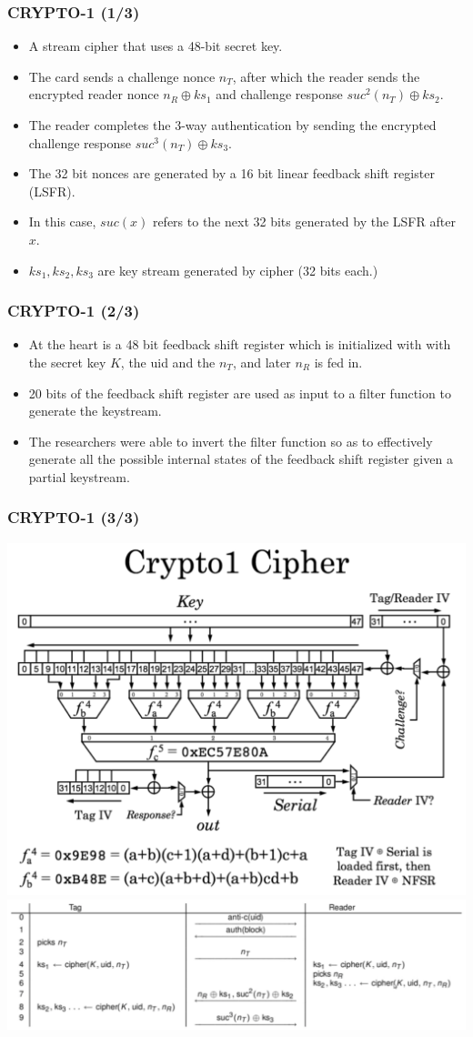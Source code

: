 \documentclass[12pt]{beamer}
\begin{document}
\begin{frame}
\frametitle{CRYPTO-1 (1/3)}
\begin{itemize}
	\item A stream cipher that uses a 48-bit secret key.
	\item The card sends a challenge nonce $n_T$, after which the reader sends the encrypted reader nonce $n_R\oplus ks_1$ and challenge response $suc^2(n_T)\oplus ks_2$.
	\item The reader completes the 3-way authentication by sending the encrypted challenge response $suc^3(n_T)\oplus ks_3$.
	\item The 32 bit nonces are generated by a 16 bit linear feedback shift register (LSFR).
	\item In this case, $suc(x)$ refers to the next 32 bits generated by the LSFR after $x$.
	\item $ks_1, ks_2, ks_3$ are key stream generated by cipher (32 bits each.)
\end{itemize}
\end{frame}

\begin{frame}
\frametitle{CRYPTO-1 (2/3)}
\begin{itemize}
	\item At the heart is a 48 bit feedback shift register which is initialized with with the secret key $K$, the uid and the $n_T$, and later $n_R$ is fed in.
	\item 20 bits of the feedback shift register are used as input to a filter function to generate the keystream.
	\item The researchers were able to invert the filter function so as to effectively generate all the possible internal states of the feedback shift register given a partial keystream.
\end{itemize}
\end{frame}

\begin{frame}
\frametitle{CRYPTO-1 (3/3)}
\begin{center}
	\includegraphics[width=0.5\linewidth]{crypto-1}
	\includegraphics[width=0.7\linewidth]{card-comm}
\end{center}
\end{frame}
\end{document}
